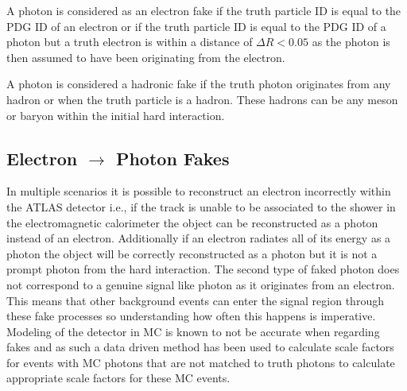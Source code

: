 A photon is considered as an electron fake if the truth particle ID is equal to the PDG ID of an electron or if the truth particle ID is equal to the PDG ID of a photon but a truth electron is within a distance of $\Delta R < 0.05$ as the photon is then assumed to have been originating from the electron.  

A photon is considered a hadronic fake if the truth photon originates from any hadron or when the truth particle is a hadron.  These hadrons can be any meson or baryon within the initial hard interaction.

\subsection{Electron $\rightarrow$ Photon Fakes}
\label{sec:FakePho}

In multiple scenarios it is possible to reconstruct an electron incorrectly within the ATLAS detector i.e., if the track is unable to be associated to the shower in the electromagnetic calorimeter the object can be reconstructed as a photon instead of an electron.  Additionally if an electron radiates all of its energy as a photon the object will be correctly reconstructed as a photon but it is not a prompt photon from the hard interaction.  The second type of faked photon does not correspond to a genuine signal like photon as it originates from an electron.  This means that other background events can enter the signal region through these fake processes so understanding how often this happens is imperative.  Modeling of the detector in MC is known to not be accurate when regarding fakes and as such a data driven method has been used to calculate scale factors for events with MC photons that are not matched to truth photons to calculate appropriate scale factors for these MC events.

